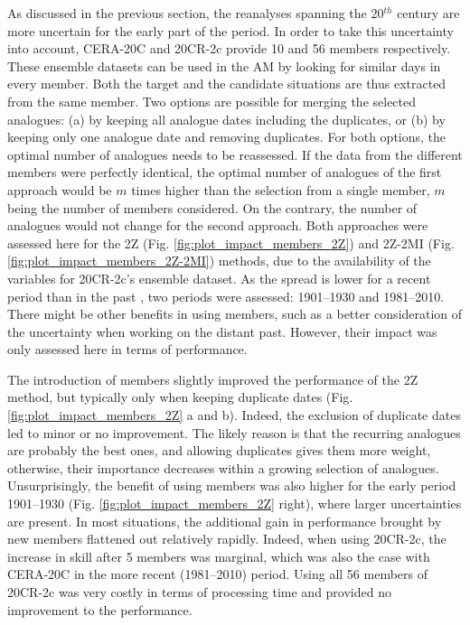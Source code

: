 \documentclass[smallextended]{svjour3}       %
\begin{document}
	As discussed in the previous section, the reanalyses spanning the 20$^{th}$ century are more uncertain for the early part of the period. In order to take this uncertainty into account, CERA-20C and 20CR-2c provide 10 and 56 members respectively. These ensemble datasets can be used in the AM by looking for similar days in every member. Both the target and the candidate situations are thus extracted from the same member. Two options are possible for merging the selected analogues: (a) by keeping all analogue dates including the duplicates, or (b) by keeping only one analogue date and removing duplicates. For both options, the optimal number of analogues needs to be reassessed. If the data from the different members were perfectly identical, the optimal number of analogues of the first approach would be $m$ times higher than the selection from a single member, $m$ being the number of members considered. On the contrary, the number of analogues would not change for the second approach. Both approaches were assessed here for the 2Z (Fig. \ref{fig:plot_impact_members_2Z}) and 2Z-2MI (Fig. \ref{fig:plot_impact_members_2Z-2MI}) methods, due to the availability of the variables for 20CR-2c's ensemble dataset. As the spread is lower for a recent period than in the past \citep{Compo2011}, two periods were assessed: 1901--1930 and 1981--2010. There might be other benefits in using members, such as a better consideration of the uncertainty when working on the distant past. However, their impact was only assessed here in terms of performance.
	
	The introduction of members slightly improved the performance of the 2Z method, but typically only when keeping duplicate dates (Fig. \ref{fig:plot_impact_members_2Z} a and b). Indeed, the exclusion of duplicate dates led to minor or no improvement. The likely reason is that the recurring analogues are probably the best ones, and allowing duplicates gives them more weight, otherwise, their importance decreases within a growing selection of analogues. Unsurprisingly, the benefit of using members was also higher for the early period 1901--1930 (Fig. \ref{fig:plot_impact_members_2Z} right), where larger uncertainties are present. In most situations, the additional gain in performance brought by new members flattened out relatively rapidly. Indeed, when using 20CR-2c, the increase in skill after 5 members was marginal, which was also the case with CERA-20C in the more recent (1981--2010) period. Using all 56 members of 20CR-2c was very costly in terms of processing time and provided no improvement to the performance. 
	
\end{document}
